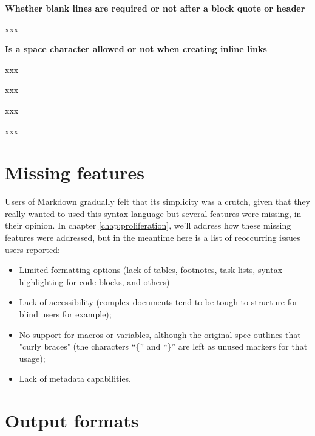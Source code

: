 \textbf{Whether blank lines are required or not after a block quote or header}\newline

xxx\newline

\textbf{Is a space character allowed or not when creating inline links}\newline

xxx\newline

\textbf{}\newline

xxx\newline

\textbf{}\newline

xxx\newline

\textbf{}\newline

xxx\newline

\newpage

\section{Missing features}

Users of Markdown gradually felt that its simplicity was a crutch, given that they really wanted to used this syntax language but several
features were missing, in their opinion. In chapter \ref{chap:proliferation}, we'll address how these missing features were addressed, but
in the meantime here is a list of reoccurring issues users reported:

\begin{itemize}
    \item Limited formatting options (lack of tables, footnotes, task lists, syntax highlighting for code blocks, and others)
    \item Lack of accessibility (complex documents tend to be tough to structure for blind users for example);
    \item No support for macros or variables, although the original spec outlines that "curly braces" (the characters ``\{'' and ``\}''
    are left as unused markers for that usage);
    \item Lack of metadata capabilities.
\end{itemize}

\section{Output formats}

